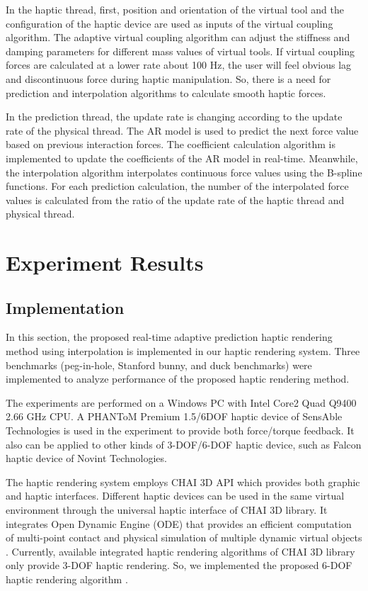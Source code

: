 \documentclass[10pt,journal,cspaper,compsoc]{IEEEtran}
\begin{document}
In the haptic thread, first, position and orientation of the virtual tool and the configuration of the haptic device are used as inputs of the virtual coupling algorithm. The adaptive virtual coupling algorithm can adjust the stiffness and damping parameters for different mass values of virtual tools.  If virtual coupling forces are calculated at a lower rate about 100 Hz, the user will feel obvious lag and discontinuous force during haptic manipulation. So, there is a need for prediction and interpolation algorithms to calculate smooth haptic forces. 

In the prediction thread, the update rate is changing according to the update rate of the physical thread. The AR model is used to predict the next force value based on previous interaction forces. The coefficient calculation algorithm is implemented to update the coefficients of the AR model in real-time.  Meanwhile, the interpolation algorithm interpolates continuous force values using the B-spline functions. For each prediction calculation, the number of the interpolated force values is calculated from the ratio of the update rate of the haptic thread and physical thread.

\section{Experiment Results}



\subsection{Implementation}
In this section, the proposed real-time adaptive prediction haptic rendering method using interpolation is implemented in our haptic rendering system. Three benchmarks (peg-in-hole, Stanford bunny, and duck benchmarks) were implemented to analyze performance of the proposed haptic rendering method. 

The experiments are performed on a Windows PC with Intel Core2 Quad Q9400 2.66 GHz CPU. A PHANToM Premium 1.5/6DOF haptic device of SensAble Technologies is used in the experiment to provide both force/torque feedback. It also can be applied to other kinds of 3-DOF/6-DOF haptic device, such as Falcon haptic device of Novint Technologies. 

The haptic rendering system employs CHAI 3D API which provides both graphic and haptic interfaces. Different haptic devices can be used in the same virtual environment through the universal haptic interface of CHAI 3D library. It integrates Open Dynamic Engine (ODE) that provides an efficient computation of multi-point contact and physical simulation of multiple dynamic virtual objects \cite{no22}. Currently, available integrated haptic rendering algorithms of CHAI 3D library only provide 3-DOF haptic rendering. So, we implemented the proposed 6-DOF haptic rendering algorithm \cite{no23}. 
\end{document}
